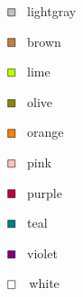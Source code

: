 \documentclass{programmingnotes}
\begin{document}
\begin{multicols*}{2}
\begin{multicols*}{3}
$\begin{tikzpicture}[scale=0.5, baseline=-0.65ex]
\filldraw[fill=lightgray, draw=black] (-6pt, -6pt) rectangle (6pt, 6pt);
\end{tikzpicture}$ \, lightgray

$\begin{tikzpicture}[scale=0.5, baseline=-0.65ex]
\filldraw[fill=brown, draw=black] (-6pt, -6pt) rectangle (6pt, 6pt);
\end{tikzpicture}$ \, brown

$\begin{tikzpicture}[scale=0.5, baseline=-0.65ex]
\filldraw[fill=lime, draw=black] (-6pt, -6pt) rectangle (6pt, 6pt);
\end{tikzpicture}$ \, lime

$\begin{tikzpicture}[scale=0.5, baseline=-0.65ex]
\filldraw[fill=olive, draw=black] (-6pt, -6pt) rectangle (6pt, 6pt);
\end{tikzpicture}$ \, olive

$\begin{tikzpicture}[scale=0.5, baseline=-0.65ex]
\filldraw[fill=orange, draw=black] (-6pt, -6pt) rectangle (6pt, 6pt);
\end{tikzpicture}$ \, orange

$\begin{tikzpicture}[scale=0.5, baseline=-0.65ex]
\filldraw[fill=pink, draw=black] (-6pt, -6pt) rectangle (6pt, 6pt);
\end{tikzpicture}$ \, pink

$\begin{tikzpicture}[scale=0.5, baseline=-0.65ex]
\filldraw[fill=purple, draw=black] (-6pt, -6pt) rectangle (6pt, 6pt);
\end{tikzpicture}$ \, purple

$\begin{tikzpicture}[scale=0.5, baseline=-0.65ex]
\filldraw[fill=teal, draw=black] (-6pt, -6pt) rectangle (6pt, 6pt);
\end{tikzpicture}$ \, teal

$\begin{tikzpicture}[scale=0.5, baseline=-0.65ex]
\filldraw[fill=violet, draw=black] (-6pt, -6pt) rectangle (6pt, 6pt);
\end{tikzpicture}$ \, violet

$\begin{tikzpicture}[scale=0.5, baseline=-0.65ex]
\filldraw[fill=white, draw=black] (-6pt, -6pt) rectangle (6pt, 6pt);
\end{tikzpicture}$~\, white
\end{multicols*}
\end{multicols*}
\end{document}
